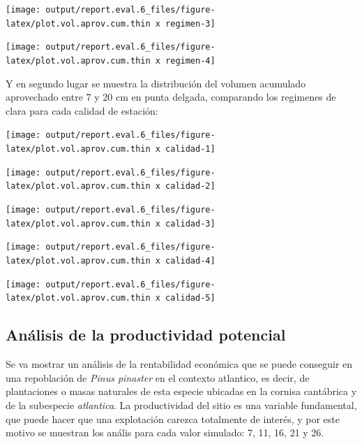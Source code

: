 \documentclass[]{article}
\begin{document}
\begin{center}\texttt{[image: output/report.eval.6\_files/figure-latex/plot.vol.aprov.cum.thin x regimen-3]} \end{center}

\begin{center}\texttt{[image: output/report.eval.6\_files/figure-latex/plot.vol.aprov.cum.thin x regimen-4]} \end{center}

Y en segundo lugar se muestra la distribución del volumen acumulado
aprovechado entre 7 y 20 cm en punta delgada, comparando los regimenes
de clara para cada calidad de estación:

\begin{center}\texttt{[image: output/report.eval.6\_files/figure-latex/plot.vol.aprov.cum.thin x calidad-1]} \end{center}

\begin{center}\texttt{[image: output/report.eval.6\_files/figure-latex/plot.vol.aprov.cum.thin x calidad-2]} \end{center}

\begin{center}\texttt{[image: output/report.eval.6\_files/figure-latex/plot.vol.aprov.cum.thin x calidad-3]} \end{center}

\begin{center}\texttt{[image: output/report.eval.6\_files/figure-latex/plot.vol.aprov.cum.thin x calidad-4]} \end{center}

\begin{center}\texttt{[image: output/report.eval.6\_files/figure-latex/plot.vol.aprov.cum.thin x calidad-5]} \end{center}

\subsection{Análisis de la productividad
potencial}\label{anuxe1lisis-de-la-productividad-potencial}

Se va mostrar un análisis de la rentabilidad económica que se puede
conseguir en una repoblación de \emph{Pinus pinaster} en el contexto
atlantico, es decir, de plantaciones o masas naturales de esta especie
ubicadas en la cornisa cantábrica y de la subespecie \emph{atlantica}.
La productividad del sitio es una variable fundamental, que puede hacer
que una explotación carezca totalmente de interés, y por este motivo se
muestran los anális para cada valor simulado: 7, 11, 16, 21 y 26.
\end{document}
